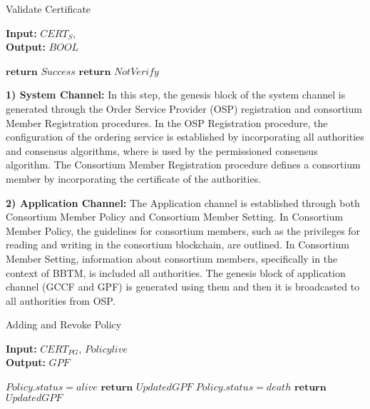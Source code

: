 \begin{algorithm}[t]
\caption{Validate Certificate}\label{al:valcert}
\begin{flushleft}
\hspace*{\algorithmicindent} \textbf{Input:} $CERT_{S}$,\\
\hspace*{\algorithmicindent} \textbf{Output:} $BOOL$  
\end{flushleft}
\begin{algorithmic}[1]
\State $\textbf{return}$ $Success$
\Else 
\State $\textbf{return}$ $Not Verify$ 
\EndIf
\end{algorithmic}
\end{algorithm} 
\setlength{\textfloatsep}{1mm}
\setlength{\floatsep}{1mm}

\textbf{1) System Channel:} In this step, the genesis block of the system channel is generated through the Order Service Provider (OSP) registration and consortium Member Registration procedures. In the OSP Registration procedure, the configuration of the ordering service is established by incorporating all authorities and consensus algorithms, where is used by the permissioned consensus algorithm. The Consortium Member Registration procedure defines a consortium member by incorporating the certificate of the authorities. 

\textbf{2) Application Channel:} The Application channel is established through both Consortium Member Policy and Consortium Member Setting. In Consortium Member Policy, the guidelines for consortium members, such as the privileges for reading and writing in the consortium blockchain, are outlined. In Consortium Member Setting, information about consortium members, specifically in the context of BBTM, is included all authorities. The genesis block of application channel (GCCF and GPF) is generated using them and then it is broadcasted to all authorities from OSP. 

\begin{algorithm}[t]
\caption{Adding and Revoke Policy}\label{al:addpolicy}
\begin{flushleft}
\hspace*{\algorithmicindent} \textbf{Input:} $CERT_{PG}$, $Policy{live}$ \\
\hspace*{\algorithmicindent} \textbf{Output:} $GPF$  
\end{flushleft}
\begin{algorithmic}[1]
\State $Policy.status = alive$
\State $\textbf{return}$ $Updated GPF$
\EndIf
{}
\State $Policy.status=death$
\State $\textbf{return}$ $Updated GPF$
\EndIf
\end{algorithmic}
\end{algorithm} 

